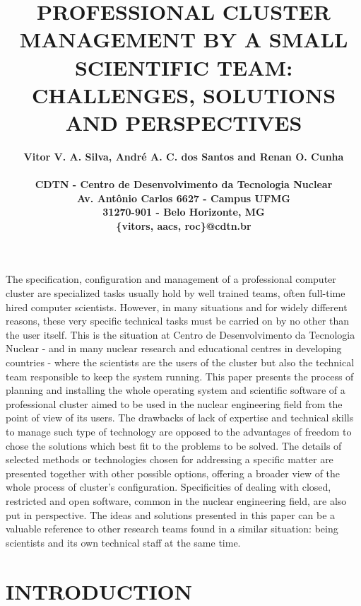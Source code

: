 \documentclass[twoside,a4paper,12pt,english]{inac17}
\title{PROFESSIONAL CLUSTER MANAGEMENT BY A SMALL SCIENTIFIC TEAM: CHALLENGES, SOLUTIONS
AND PERSPECTIVES}
\author{
  \bf{Vitor V. A. Silva, Andr\'e A. C. dos Santos and Renan O. Cunha}\\ \\
  CDTN - Centro de Desenvolvimento da Tecnologia Nuclear\\
  Av. Ant\^onio Carlos 6627 - Campus UFMG\\
  31270-901 - Belo Horizonte, MG\\
  \{vitors, aacs, roc\}@cdtn.br}
\begin{document}
\maketitle

\pagestyle{myheadings}
\thispagestyle{empty}
\markboth{}{}


\thispagestyle{empty}


\begin{abstract_full_paper}
  The specification, configuration and management of a professional computer cluster are specialized
tasks usually hold by well trained teams, often full-time hired computer scientists. However, in
many situations and for widely different reasons, these very specific technical tasks must
be carried on by no other than the user itself. This is the situation at Centro de Desenvolvimento
da Tecnologia Nuclear - and in many nuclear research and educational centres in developing countries -
where the scientists are the users of the cluster but also the technical
team responsible to keep the system running. This paper presents the process of planning
and installing the whole operating system and scientific software of a professional cluster
aimed to be used in the nuclear engineering field from the point of view of its users.
The drawbacks of lack of expertise and technical skills to
manage such type of technology are opposed to the advantages of freedom to chose the solutions
which best fit to the problems to be solved. The details of selected methods or technologies
chosen for addressing a specific matter are presented together with other possible options, 
offering a broader view of the whole process of cluster's configuration. Specificities
of dealing with closed, restricted and open software, common in the nuclear engineering field,
are also put in perspective. The ideas and solutions presented in this paper can be a
valuable reference to other research teams found in a similar situation:
being scientists and its own technical staff at the same time.
\end{abstract_full_paper}


\section{INTRODUCTION}\label{int}
\end{document}
